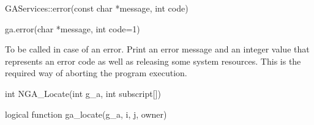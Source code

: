 \documentclass[10pt]{article}
\begin{document}
\begin{cxxapi}
\begin{cxxcode}
GAServices::error(const char *message, int code)
\end{cxxcode}
\begin{funcargs}
\end{funcargs}
\end{cxxapi}

\begin{pyapi}
\begin{pycode}
ga.error(char *message, int code=1)
\end{pycode}
\begin{funcargs}
\end{funcargs}
\end{pyapi}

\local

\begin{desc}

To be called in case of an error. Print an error message and an integer value
that represents an error code as well as releasing some system resources. This is the
required way of aborting the program execution.

\end{desc}


\begin{capi}
\begin{ccode}
int NGA_Locate(int g_a, int subscript[])
\end{ccode}
\begin{funcargs}
\end{funcargs}
\end{capi}

\begin{f2dapi}
\begin{fcode}
logical function ga_locate(g_a, i, j, owner)
\end{fcode}
\begin{funcargs}
\end{funcargs}
\end{f2dapi}
\end{document}
